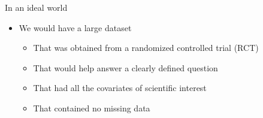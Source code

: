 

\begin{frame}{In an ideal world}
  \begin{itemize}
  \item We would have a large dataset
  \begin{itemize}
   \item That was obtained from a randomized controlled trial (RCT)
   \item That would help answer a clearly defined question
   \item That had all the covariates of scientific interest
   \item That contained no missing data
  \end{itemize}

  \end{itemize}
\end{frame}

